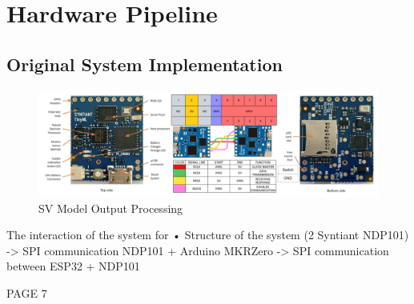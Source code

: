 \section{Hardware Pipeline}
\label{sec:hw pipeline}
\subsection{Original System Implementation}
\begin{center}
    \centering
    \begin{figure}[!h]
        \includegraphics[width=1.0\textwidth]{images/4.05 Hardware Pipeline 2 NDP101.png}
        \caption{SV Model Output Processing}
    \end{figure}
\end{center}
The interaction of the system for 
• Structure of the system (2 Syntiant NDP101)\newline
-> SPI communication NDP101 + Arduino MKRZero\newline
-> SPI communication between ESP32 + NDP101\newline\newline
\newpage

PAGE 7
\newpage


